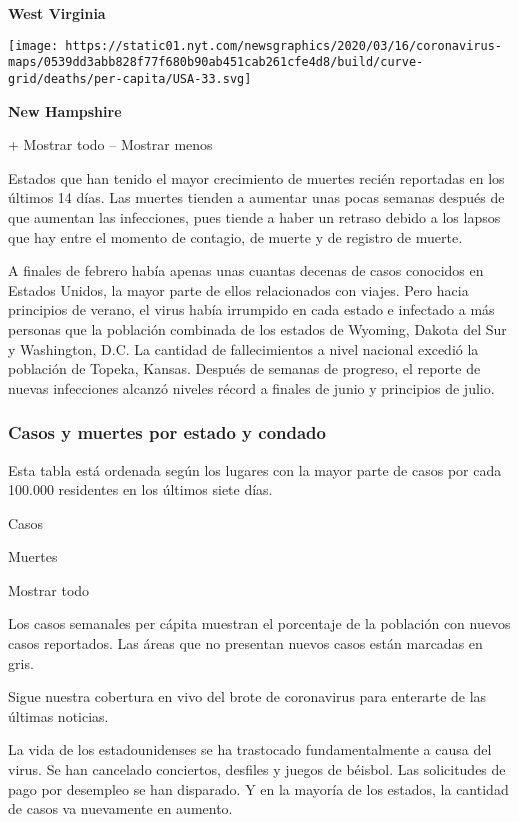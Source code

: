 \textbf{West Virginia}

\href{https://www.nytimes.com/interactive/2020/us/new-hampshire-coronavirus-cases.html}{}

\texttt{[image: https://static01.nyt.com/newsgraphics/2020/03/16/coronavirus-maps/0539dd3abb828f77f680b90ab451cab261cfe4d8/build/curve-grid/deaths/per-capita/USA-33.svg]}

\textbf{New Hampshire}

+ Mostrar todo -- Mostrar menos

Estados que han tenido el mayor crecimiento de muertes recién reportadas
en los últimos 14 días. Las muertes tienden a aumentar unas pocas
semanas después de que aumentan las infecciones, pues tiende a haber un
retraso debido a los lapsos que hay entre el momento de contagio, de
muerte y de registro de muerte.

A finales de febrero había apenas unas cuantas decenas de casos
conocidos en Estados Unidos, la mayor parte de ellos relacionados con
viajes. Pero hacia principios de verano, el virus había irrumpido en
cada estado e infectado a más personas que la población combinada de los
estados de Wyoming, Dakota del Sur y Washington, D.C. La cantidad de
fallecimientos a nivel nacional excedió la población de Topeka, Kansas.
Después de semanas de progreso, el reporte de nuevas infecciones alcanzó
niveles récord a finales de junio y principios de julio.

\hypertarget{casos-y-muertes-por-estado-y-condado}{%
\subsubsection{Casos y muertes por estado y
condado}\label{casos-y-muertes-por-estado-y-condado}}

Esta tabla está ordenada según los lugares con la mayor parte de casos
por cada 100.000 residentes en los últimos siete días.

Casos

Muertes

Mostrar todo

Los casos semanales per cápita muestran el porcentaje de la población
con nuevos casos reportados. Las áreas que no presentan nuevos casos
están marcadas en gris.

Sigue nuestra cobertura en vivo del brote de coronavirus para enterarte
de las últimas noticias.

La vida de los estadounidenses se ha trastocado fundamentalmente a causa
del virus. Se han cancelado conciertos, desfiles y juegos de béisbol.
Las solicitudes de pago por desempleo se han disparado. Y en la mayoría
de los estados, la cantidad de casos va nuevamente en aumento.


